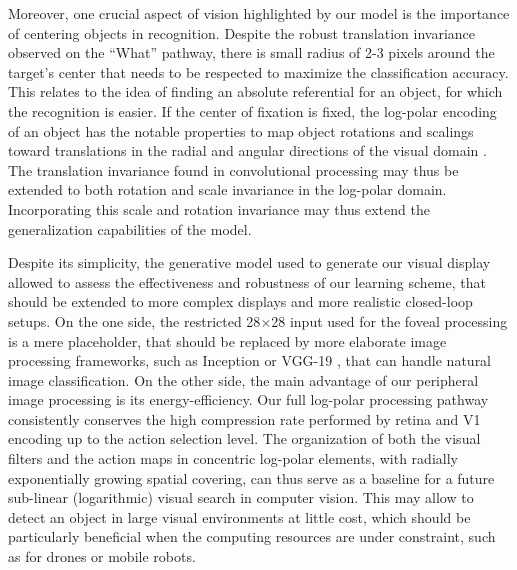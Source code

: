 Moreover, one crucial aspect of vision highlighted by our model is the importance of centering objects in recognition. Despite the robust translation invariance observed on the ``What'' pathway, there is small radius of 2-3 pixels around the target's center that needs to be respected to maximize the classification accuracy. This relates to the idea of finding an absolute referential for an object, for which the recognition is easier. If the center of fixation is fixed, the log-polar encoding of an object has the notable properties to map object rotations and scalings toward translations in the radial and angular directions of the visual domain \cite{Traver10}. The translation invariance found in convolutional processing may thus be extended to both rotation and scale invariance in the log-polar domain. Incorporating this scale and rotation invariance may thus extend the generalization capabilities of the model.



Despite its simplicity, the generative model used to generate our visual display allowed to assess the effectiveness and robustness of our learning scheme, that should be extended to more complex displays and more realistic closed-loop setups.
On the one side, the restricted 28$\times$28 input used for the foveal processing is a mere placeholder, that should be replaced by more elaborate image processing frameworks, such as Inception \cite{szegedy2015going} or VGG-19
\cite{simonyan2014very}, that can handle natural image classification. 
On the other side, the main advantage of our peripheral image processing is its  energy-efficiency. Our full log-polar processing pathway consistently conserves the high compression rate performed by retina and V1 encoding up to the action selection level. The organization of both the visual filters and the action maps in concentric log-polar elements, with radially exponentially growing spatial covering, can thus serve as a baseline for a future sub-linear (logarithmic) visual search in computer vision. This may allow to detect an object in large visual environments at little cost, which should be particularly beneficial when the computing resources are under constraint, such as for drones or mobile robots. 


